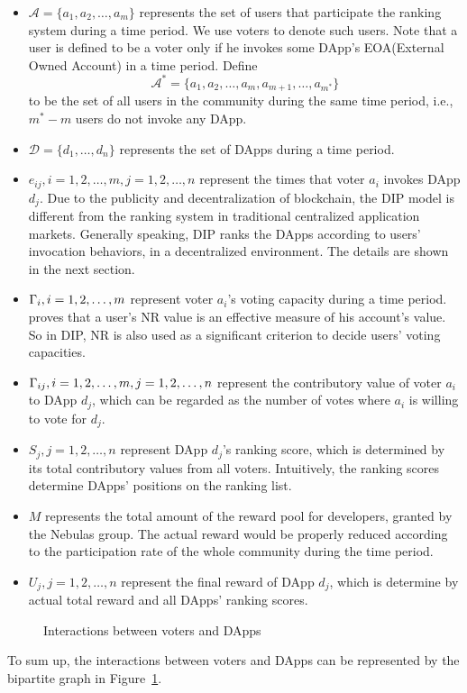 \begin{itemize}
	\item $\mathcal{A}=\{a_1,a_2,\ldots,a_m\}$ represents the set of users that
	  participate the ranking system during a time period. We use voters to
	  denote such users. Note that a user is defined to be a voter only if he
	  invokes some DApp's EOA(External Owned Account) in a time period. Define
	  $$\mathcal{A}^*=\{a_1,a_2,\ldots,a_m,a_{m+1},\ldots,a_{m^*}\}$$
	to be the set of all users in the community during the same time period, i.e., $m^*-m$ users do not invoke any DApp.
  \item $\mathcal{D}=\{d_1,\ldots,d_n\}$ represents the set of DApps during a time period.
  \item $e_{ij},i=1,2,\ldots,m, j=1,2,\ldots,n$ represent the times that voter $a_i$ invokes DApp $d_j$. Due to the publicity and decentralization of blockchain, the DIP model is different from the ranking system in traditional centralized application markets. Generally speaking, DIP ranks the DApps according to users' invocation behaviors, in a decentralized environment. The details are shown in the next section.

  \item $\Gamma_i, i=1,2,\ldots,m$ represent voter $a_i$'s voting capacity during a time period.
  ~\cite{Nebulasyellowpaper} proves that a user's NR value is an effective measure of his account's value. So in DIP, NR is also used as a significant criterion to decide users' voting capacities.
  \item $\Gamma_{ij}, i=1,2,\ldots,m,j=1,2,\ldots,n$ represent the contributory value of voter $a_i$ to DApp $d_j$, which can be regarded as the number of votes where $a_i$ is willing to vote for $d_j$.

  \item $S_j, j=1,2,\ldots,n$ represent DApp $d_j$'s ranking score, which is determined by its total contributory values from all voters. Intuitively, the ranking scores determine DApps' positions on the ranking list.

  	\item $M$ represents the total amount of the reward pool for developers, granted by the Nebulas group.  The actual reward would be properly reduced according to the participation rate of the whole community during the time period.
   \item $U_j, j=1,2,\ldots,n$ represent the final reward of DApp $d_j$, which is determine by actual total reward and all DApps' ranking scores.
 \end{itemize}
   \begin{figure}
   	\centering
   	
   	\caption{Interactions between voters and DApps \label{fig:interact}}
   \end{figure}
  To sum up, the interactions between voters and DApps can be represented by the bipartite graph in Figure~\ref{fig:interact}.


